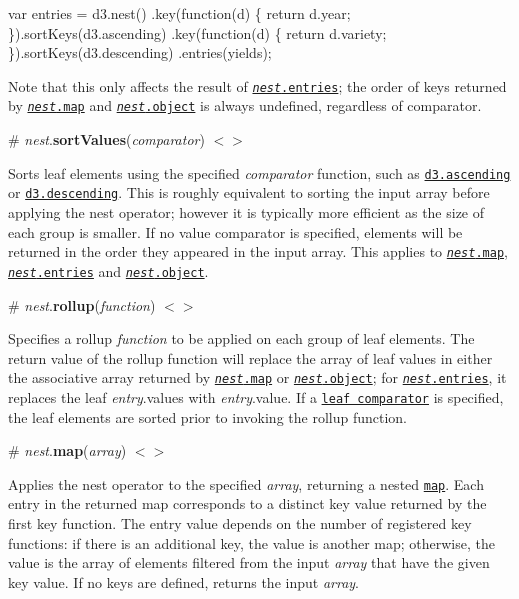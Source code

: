 \begin{DoxyCode}
var entries = d3.nest()
    .key(function(d) \{ return d.year; \}).sortKeys(d3.ascending)
    .key(function(d) \{ return d.variety; \}).sortKeys(d3.descending)
    .entries(yields);
\end{DoxyCode}


Note that this only affects the result of \href{#nest_entries}{\tt {\itshape nest}.entries}; the order of keys returned by \href{#nest_map}{\tt {\itshape nest}.map} and \href{#nest_object}{\tt {\itshape nest}.object} is always undefined, regardless of comparator.

\label{_nest_sortValues}%
\# {\itshape nest}.{\bfseries sort\+Values}({\itshape comparator}) \href{https://github.com/d3/d3-collection/blob/master/src/nest.js#L6}{\tt $<$$>$}

Sorts leaf elements using the specified {\itshape comparator} function, such as \href{https://github.com/d3/d3-array#ascending}{\tt d3.\+ascending} or \href{https://github.com/d3/d3-array#descending}{\tt d3.\+descending}. This is roughly equivalent to sorting the input array before applying the nest operator; however it is typically more efficient as the size of each group is smaller. If no value comparator is specified, elements will be returned in the order they appeared in the input array. This applies to \href{#nest_map}{\tt {\itshape nest}.map}, \href{#nest_entries}{\tt {\itshape nest}.entries} and \href{#nest_object}{\tt {\itshape nest}.object}.

\label{_nest_rollup}%
\# {\itshape nest}.{\bfseries rollup}({\itshape function}) \href{https://github.com/d3/d3-collection/blob/master/src/nest.js#L7}{\tt $<$$>$}

Specifies a rollup {\itshape function} to be applied on each group of leaf elements. The return value of the rollup function will replace the array of leaf values in either the associative array returned by \href{#nest_map}{\tt {\itshape nest}.map} or \href{#nest_object}{\tt {\itshape nest}.object}; for \href{#nest_entries}{\tt {\itshape nest}.entries}, it replaces the leaf {\itshape entry}.values with {\itshape entry}.value. If a \href{#nest_sortValues}{\tt leaf comparator} is specified, the leaf elements are sorted prior to invoking the rollup function.

\label{_nest_map}%
\# {\itshape nest}.{\bfseries map}({\itshape array}) \href{https://github.com/d3/d3-collection/blob/master/src/nest.js#L50}{\tt $<$$>$}

Applies the nest operator to the specified {\itshape array}, returning a nested \href{#map}{\tt map}. Each entry in the returned map corresponds to a distinct key value returned by the first key function. The entry value depends on the number of registered key functions\+: if there is an additional key, the value is another map; otherwise, the value is the array of elements filtered from the input {\itshape array} that have the given key value. If no keys are defined, returns the input {\itshape array}.

